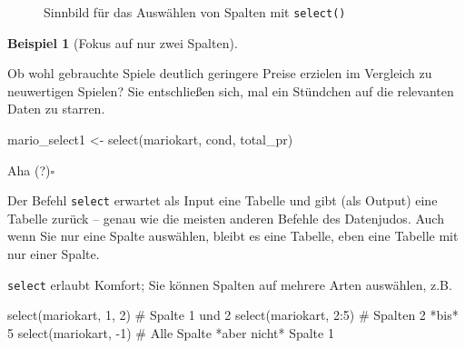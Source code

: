 \documentclass[
  a4paper,
]{scrbook}
\newenvironment{Shaded}{\begin{snugshade}}{\end{snugshade}}
\newcommand{\CommentTok}[1]{\textcolor[rgb]{0.37,0.37,0.37}{#1}}
\newcommand{\DecValTok}[1]{\textcolor[rgb]{0.68,0.00,0.00}{#1}}
\newcommand{\FunctionTok}[1]{\textcolor[rgb]{0.28,0.35,0.67}{#1}}
\newcommand{\NormalTok}[1]{\textcolor[rgb]{0.00,0.23,0.31}{#1}}
\newcommand{\OtherTok}[1]{\textcolor[rgb]{0.00,0.23,0.31}{#1}}
\newcommand{\SpecialCharTok}[1]{\textcolor[rgb]{0.37,0.37,0.37}{#1}}
\theoremstyle{definition}
\newtheorem{example}{Beispiel}[chapter]
\theoremstyle{definition}
\theoremstyle{definition}
\theoremstyle{remark}
\begin{document}
\begin{figure}


\caption{\label{fig-select}Sinnbild für das Auswählen von Spalten mit
\texttt{select()}}

\end{figure}%

\begin{example}[Fokus auf nur zwei
Spalten]\protect\hypertarget{exm-select}{}\label{exm-select}

Ob wohl gebrauchte Spiele deutlich geringere Preise erzielen im
Vergleich zu neuwertigen Spielen? Sie entschließen sich, mal ein
Stündchen auf die relevanten Daten zu starren.

\begin{Shaded}
\begin{Highlighting}[]
\NormalTok{mario\_select1 }\OtherTok{\textless{}{-}} \FunctionTok{select}\NormalTok{(mariokart, cond, total\_pr)}
\end{Highlighting}
\end{Shaded}

Aha (?)\(\square\)

\end{example}

Der Befehl \texttt{select} erwartet als Input eine Tabelle und gibt (als
Output) eine Tabelle zurück -- genau wie die meisten anderen Befehle des
Datenjudos. Auch wenn Sie nur eine Spalte auswählen, bleibt es eine
Tabelle, eben eine Tabelle mit nur einer Spalte.

\texttt{select} erlaubt Komfort; Sie können Spalten auf mehrere Arten
auswählen, z.B.

\begin{Shaded}
\begin{Highlighting}[]
\FunctionTok{select}\NormalTok{(mariokart, }\DecValTok{1}\NormalTok{, }\DecValTok{2}\NormalTok{)  }\CommentTok{\# Spalte 1 und 2}
\FunctionTok{select}\NormalTok{(mariokart, }\DecValTok{2}\SpecialCharTok{:}\DecValTok{5}\NormalTok{)  }\CommentTok{\#  Spalten 2 *bis* 5 }
\FunctionTok{select}\NormalTok{(mariokart, }\SpecialCharTok{{-}}\DecValTok{1}\NormalTok{)  }\CommentTok{\# Alle Spalte *aber nicht* Spalte 1}
\end{Highlighting}
\end{Shaded}
\end{document}
